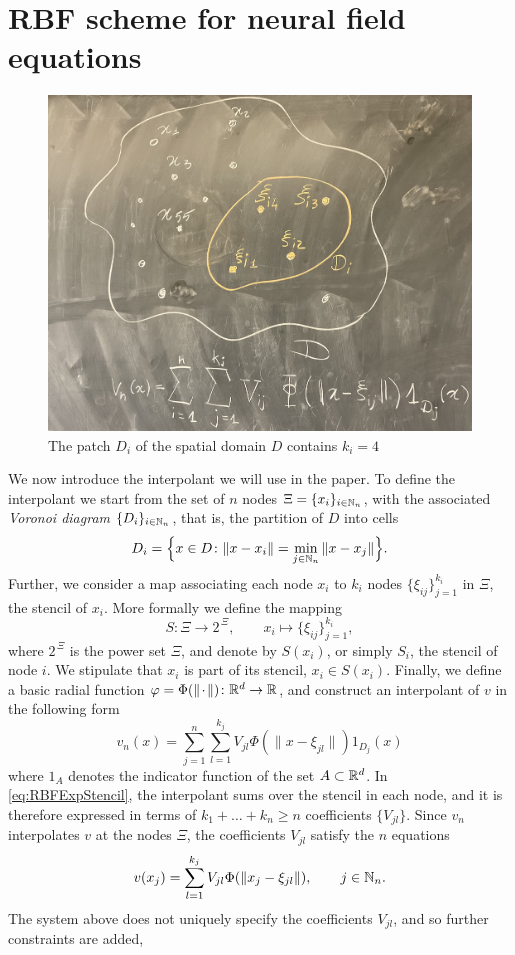\documentclass[a4paper]{siamart190516}
\begin{document}
\section{RBF scheme for neural field equations}\label{sec:RBFScheme} 
\begin{figure}
  \centering
  \includegraphics[width=\textwidth]{sketch}
  \caption{The patch $D_i$ of the spatial domain $D$ contains $k_i =4$}
  \label{fig:sketch}
\end{figure}

We now introduce the interpolant we will use in the paper. To define the interpolant
we start from the set of $n$ nodes $\Xi = \{ x_i \}_{i \in \mathbb{N}_n}$, with the
associated \textit{Voronoi diagram} $\{ D_i \}_{i \in \mathbb{N}_n}$, that is, the
partition of $D$ into cells
\[
  D_i = \Bigl\{ x \in D \colon \| x - x_i \| = \min_{j \in \mathbb{N}_n} \| x - x_j \| \Bigr\}.
\]
Further, we consider a map associating each node $x_i$ to $k_i$ nodes $\{\xi_{ij}
\}_{j = 1}^{k_i}$ in $\Xi$, the stencil of $x_i$. More formally we define the
mapping
\[
  S \colon \Xi \to 2^{\,\Xi}, \qquad x_i \mapsto \{ \xi_{ij} \}_{j = 1}^{k_i},
\]
where $2^{\,\Xi}$ is the power set $\Xi$, and denote by $S(x_i)$, or simply $S_i$, the
stencil of node $i$. We stipulate that $x_i$ is part of its stencil, $x_i \in
S(x_i)$. Finally, we define a basic radial function $\varphi = \Phi( \| {\mkern 2mu\cdot\mkern 2mu} \|)
\colon \mathbb{R}^d \to \mathbb{R}$, and construct an interpolant of $v$ in the
following form
\begin{equation}\label{eq:RBFExpStencil}   
  v_n(x) = \sum_{j = 1}^{n} \sum_{l=1}^{k_j} V_{jl} \Phi(\| x - \xi_{jl} \|) 1_{D_j}(x) 
\end{equation}
where $1_A$ denotes the indicator function of the set $A \subset \mathbb{R}^d$. In
\cref{eq:RBFExpStencil}, the interpolant sums over the stencil in each node, and it
is therefore expressed in terms of $k_1 + \dots + k_n \geq n$ coefficients $\{
V_{jl}\}$. Since $v_n$ interpolates $v$ at the nodes $\Xi$, the coefficients
$V_{jl}$ satisfy the $n$ equations
\[
  v(x_j) = \sum_{l=1}^{k_j} V_{jl} \Phi(\| x_j - \xi_{jl} \|), \qquad j \in \mathbb{N}_n.
\]
The system above does not uniquely specify the coefficients $V_{jl}$, and so further
constraints are added,
\end{document}
